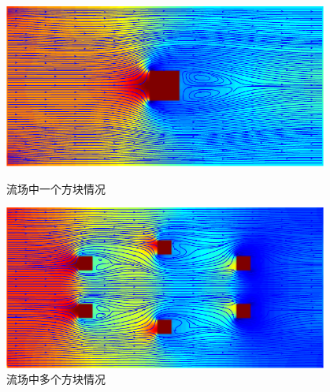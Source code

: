 \documentclass[a4paper,boxed,11pt]{caspset}
\begin{document}
\begin{figure}[!htb]
\begin{minipage}[b]{.5\textwidth}
\centering
\includegraphics[width=0.95\textwidth]{./figures/01.pdf}
\caption{流场中一个方块情况}
\end{minipage}
\begin{minipage}[b]{.5\textwidth}
\centering
\includegraphics[width=0.95\textwidth]{./figures/03.pdf}
\caption{流场中多个方块情况}
\end{minipage}
\end{figure}
\end{document}
